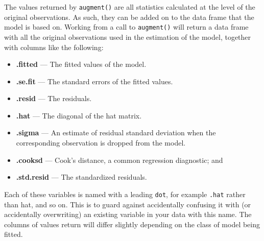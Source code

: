 \documentclass[]{book}
\newenvironment{Shaded}{\begin{snugshade}}{\end{snugshade}}
\newcommand{\CommentTok}[1]{\textcolor[rgb]{0.56,0.35,0.01}{\textit{#1}}}
\newcommand{\KeywordTok}[1]{\textcolor[rgb]{0.13,0.29,0.53}{\textbf{#1}}}
\newcommand{\NormalTok}[1]{#1}
\newcommand{\OperatorTok}[1]{\textcolor[rgb]{0.81,0.36,0.00}{\textbf{#1}}}
\newcommand{\StringTok}[1]{\textcolor[rgb]{0.31,0.60,0.02}{#1}}
\providecommand{\tightlist}{%
  \setlength{\itemsep}{0pt}\setlength{\parskip}{0pt}}
\begin{document}
The values returned by \texttt{augment()} are all statistics calculated at the level of the original observations. As such, they can be added on to the data frame that the model is based on. Working from a call to \texttt{augment()} will return a data frame with all the original observations used in the estimation of the model, together with columns like the following:

\begin{itemize}
\tightlist
\item
  \textbf{.fitted} --- The fitted values of the model.
\item
  \textbf{.se.fit} --- The standard errors of the fitted values.
\item
  \textbf{.resid} --- The residuals.
\item
  \textbf{.hat} --- The diagonal of the hat matrix.
\item
  \textbf{.sigma} --- An estimate of residual standard deviation when the corresponding observation is dropped from the model.
\item
  \textbf{.cooksd} --- Cook's distance, a common regression diagnostic; and
\item
  \textbf{.std.resid} --- The standardized residuals.
\end{itemize}

Each of these variables is named with a leading \texttt{dot}, for example \texttt{.hat} rather than hat, and so on. This is to guard against accidentally confusing it with (or accidentally overwriting) an existing variable in your data with this name. The columns of values return will differ slightly depending on the class of model being fitted.\\

\begin{Shaded}
\end{Shaded}
\end{document}
